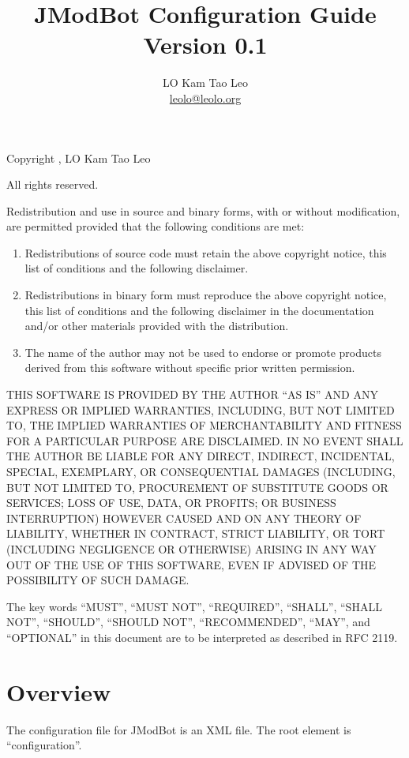 \documentclass{report}
\title{JModBot Configuration Guide\\Version 0.1}
\author{LO Kam Tao Leo\\\href{mailto:leolo@leolo.org}{leolo@leolo.org}}
\begin{document}
	\maketitle
	
	Copyright , LO Kam Tao Leo
	
	All rights reserved.
	
	Redistribution and use in source and binary forms, with or without
	modification, are permitted provided that the following conditions are
	met:
	\begin{enumerate}
		\item  Redistributions of source code must retain the above copyright
	notice, this list of conditions and the following disclaimer. 
	
		\item Redistributions in binary form must reproduce the above copyright
	notice, this list of conditions and the following disclaimer in
	the documentation and/or other materials provided with the
	distribution.  
	
		\item The name of the author may not be used to
	endorse or promote products derived from this software without
	specific prior written permission.
	\end{enumerate}

	THIS SOFTWARE IS PROVIDED BY THE AUTHOR ``AS IS'' AND ANY EXPRESS OR
	IMPLIED WARRANTIES, INCLUDING, BUT NOT LIMITED TO, THE IMPLIED
	WARRANTIES OF MERCHANTABILITY AND FITNESS FOR A PARTICULAR PURPOSE ARE
	DISCLAIMED. IN NO EVENT SHALL THE AUTHOR BE LIABLE FOR ANY DIRECT,
	INDIRECT, INCIDENTAL, SPECIAL, EXEMPLARY, OR CONSEQUENTIAL DAMAGES
	(INCLUDING, BUT NOT LIMITED TO, PROCUREMENT OF SUBSTITUTE GOODS OR
	SERVICES; LOSS OF USE, DATA, OR PROFITS; OR BUSINESS INTERRUPTION)
	HOWEVER CAUSED AND ON ANY THEORY OF LIABILITY, WHETHER IN CONTRACT,
	STRICT LIABILITY, OR TORT (INCLUDING NEGLIGENCE OR OTHERWISE) ARISING
	IN ANY WAY OUT OF THE USE OF THIS SOFTWARE, EVEN IF ADVISED OF THE
	POSSIBILITY OF SUCH DAMAGE. 
	
	\vspace{0.5in}
	\noindent\makebox[\linewidth]{\rule{\textwidth}{0.4pt}}
	\vspace{0.5in}
	
	The key words ``MUST'', ``MUST NOT'', ``REQUIRED'', ``SHALL'', ``SHALL
	NOT'', ``SHOULD'', ``SHOULD NOT'', ``RECOMMENDED'',  ``MAY'', and
	``OPTIONAL'' in this document are to be interpreted as described in
	RFC 2119.
	\tableofcontents
	\chapter{Overview}
	The configuration file for JModBot is an XML file. The root element is ``configuration''. 
	
\end{document}
